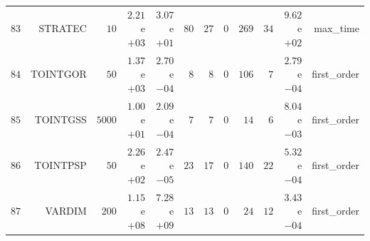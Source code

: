 \begin{longtable}{rrrrrrrrrrrr}
  \(    83\) & STRATEC & \(    10\) & \( 2.21\)e\(+03\) & \( 3.07\)e\(+01\) & \(    80\) & \(    27\) & \(     0\) & \(   269\) & \(    34\) & \( 9.62\)e\(+02\) & max\_time \\
  \(    84\) & TOINTGOR & \(    50\) & \( 1.37\)e\(+03\) & \( 2.70\)e\(-04\) & \(     8\) & \(     8\) & \(     0\) & \(   106\) & \(     7\) & \( 2.79\)e\(-04\) & first\_order \\
  \(    85\) & TOINTGSS & \(  5000\) & \( 1.00\)e\(+01\) & \( 2.09\)e\(-04\) & \(     7\) & \(     7\) & \(     0\) & \(    14\) & \(     6\) & \( 8.04\)e\(-03\) & first\_order \\
  \(    86\) & TOINTPSP & \(    50\) & \( 2.26\)e\(+02\) & \( 2.47\)e\(-05\) & \(    23\) & \(    17\) & \(     0\) & \(   140\) & \(    22\) & \( 5.32\)e\(-04\) & first\_order \\
  \(    87\) & VARDIM & \(   200\) & \( 1.15\)e\(+08\) & \( 7.28\)e\(+09\) & \(    13\) & \(    13\) & \(     0\) & \(    24\) & \(    12\) & \( 3.43\)e\(-04\) & first\_order \\\hline
\end{longtable}
